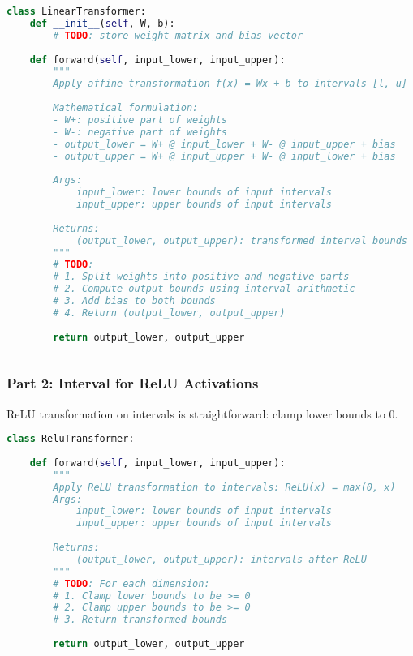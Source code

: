 \begin{lstlisting}[language=Python]
class LinearTransformer:
    def __init__(self, W, b):
        # TODO: store weight matrix and bias vector
    
    def forward(self, input_lower, input_upper):
        """
        Apply affine transformation f(x) = Wx + b to intervals [l, u]
        
        Mathematical formulation:
        - W+: positive part of weights
        - W-: negative part of weights 
        - output_lower = W+ @ input_lower + W- @ input_upper + bias
        - output_upper = W+ @ input_upper + W- @ input_lower + bias
        
        Args:
            input_lower: lower bounds of input intervals
            input_upper: upper bounds of input intervals
            
        Returns:
            (output_lower, output_upper): transformed interval bounds
        """
        # TODO:
        # 1. Split weights into positive and negative parts
        # 2. Compute output bounds using interval arithmetic
        # 3. Add bias to both bounds
        # 4. Return (output_lower, output_upper)
        
        return output_lower, output_upper
        
\end{lstlisting}

\subsubsection{Part 2: Interval for ReLU Activations}

ReLU transformation on intervals is straightforward: clamp lower bounds to 0.

\begin{lstlisting}[language=Python]
class ReluTransformer:
    
    def forward(self, input_lower, input_upper):
        """
        Apply ReLU transformation to intervals: ReLU(x) = max(0, x)
        Args:
            input_lower: lower bounds of input intervals  
            input_upper: upper bounds of input intervals
            
        Returns:
            (output_lower, output_upper): intervals after ReLU
        """
        # TODO: For each dimension:
        # 1. Clamp lower bounds to be >= 0
        # 2. Clamp upper bounds to be >= 0  
        # 3. Return transformed bounds
        
        return output_lower, output_upper
        
\end{lstlisting}

